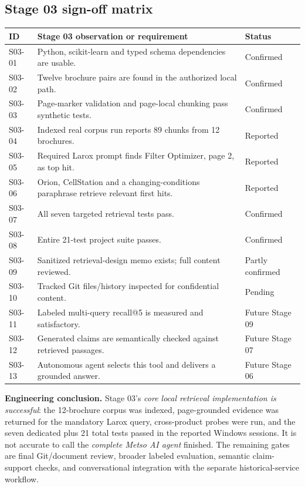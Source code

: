 \documentclass[11pt,a4paper]{article}
\begin{document}
\subsection{Stage 03 sign-off matrix}
\begin{tabularx}{\textwidth}{@{}L{13mm}L{106mm}Y@{}}
\toprule\textbf{ID} & \textbf{Stage 03 observation or requirement} & \textbf{Status}\\
\midrule
S03-01 & Python, scikit-learn and typed schema dependencies are usable. & Confirmed\\
S03-02 & Twelve brochure pairs are found in the authorized local path. & Confirmed\\
S03-03 & Page-marker validation and page-local chunking pass synthetic tests. & Confirmed\\
S03-04 & Indexed real corpus run reports 89 chunks from 12 brochures. & Reported\\
S03-05 & Required Larox prompt finds Filter Optimizer, page 2, as top hit. & Reported\\
S03-06 & Orion, CellStation and a changing-conditions paraphrase retrieve relevant first hits. & Reported\\
S03-07 & All seven targeted retrieval tests pass. & Confirmed\\
S03-08 & Entire 21-test project suite passes. & Confirmed\\
S03-09 & Sanitized retrieval-design memo exists; full content reviewed. & Partly confirmed\\
S03-10 & Tracked Git files/history inspected for confidential content. & Pending\\
S03-11 & Labeled multi-query recall@5 is measured and satisfactory. & Future Stage 09\\
S03-12 & Generated claims are semantically checked against retrieved passages. & Future Stage 07\\
S03-13 & Autonomous agent selects this tool and delivers a grounded answer. & Future Stage 06\\
\bottomrule
\end{tabularx}

\begin{keybox}
\textbf{Engineering conclusion.} Stage 03's \emph{core local retrieval implementation is successful}: the 12-brochure corpus was indexed, page-grounded evidence was returned for the mandatory Larox query, cross-product probes were run, and the seven dedicated plus 21 total tests passed in the reported Windows sessions. It is not accurate to call the \emph{complete Metso AI agent} finished. The remaining gates are final Git/document review, broader labeled evaluation, semantic claim-support checks, and conversational integration with the separate historical-service workflow.
\end{keybox}
\end{document}
